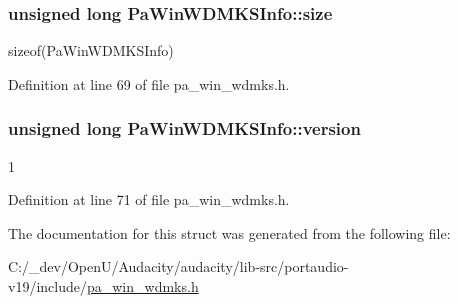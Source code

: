 \subsubsection[{\texorpdfstring{size}{size}}]{\setlength{\rightskip}{0pt plus 5cm}unsigned long Pa\+Win\+W\+D\+M\+K\+S\+Info\+::size}\hypertarget{struct_pa_win_w_d_m_k_s_info_a550f4ab63732471599e64a2961a63125}{}\label{struct_pa_win_w_d_m_k_s_info_a550f4ab63732471599e64a2961a63125}
sizeof(\+Pa\+Win\+W\+D\+M\+K\+S\+Info) 

Definition at line 69 of file pa\+\_\+win\+\_\+wdmks.\+h.

\subsubsection[{\texorpdfstring{version}{version}}]{\setlength{\rightskip}{0pt plus 5cm}unsigned long Pa\+Win\+W\+D\+M\+K\+S\+Info\+::version}\hypertarget{struct_pa_win_w_d_m_k_s_info_a17221c5458a73c0295dff5cef739eb7d}{}\label{struct_pa_win_w_d_m_k_s_info_a17221c5458a73c0295dff5cef739eb7d}
1 

Definition at line 71 of file pa\+\_\+win\+\_\+wdmks.\+h.



The documentation for this struct was generated from the following file\+:\begin{DoxyCompactItemize}
\item 
C\+:/\+\_\+dev/\+Open\+U/\+Audacity/audacity/lib-\/src/portaudio-\/v19/include/\hyperlink{pa__win__wdmks_8h}{pa\+\_\+win\+\_\+wdmks.\+h}\end{DoxyCompactItemize}
